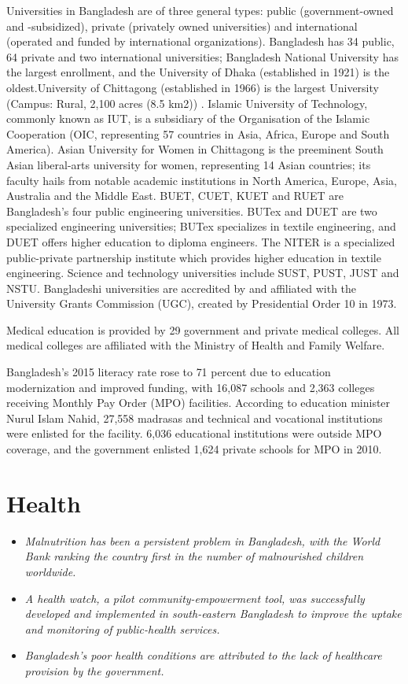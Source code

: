 Universities in Bangladesh are of three general types: public
(government-owned and -subsidized), private (privately owned
universities) and international (operated and funded by international
organizations). Bangladesh has 34 public, 64 private and two
international universities; Bangladesh National University has the
largest enrollment, and the University of Dhaka (established in 1921) is
the oldest.University of Chittagong (established in 1966) is the largest
University (Campus: Rural, 2,100 acres (8.5 km2)) . Islamic University
of Technology, commonly known as IUT, is a subsidiary of the
Organisation of the Islamic Cooperation (OIC, representing 57 countries
in Asia, Africa, Europe and South America). Asian University for Women
in Chittagong is the preeminent South Asian liberal-arts university for
women, representing 14 Asian countries; its faculty hails from notable
academic institutions in North America, Europe, Asia, Australia and the
Middle East. BUET, CUET, KUET and RUET are Bangladesh's four public
engineering universities. BUTex and DUET are two specialized engineering
universities; BUTex specializes in textile engineering, and DUET offers
higher education to diploma engineers. The NITER is a specialized
public-private partnership institute which provides higher education in
textile engineering. Science and technology universities include SUST,
PUST, JUST and NSTU. Bangladeshi universities are accredited by and
affiliated with the University Grants Commission (UGC), created by
Presidential Order 10 in 1973.

Medical education is provided by 29 government and private medical
colleges. All medical colleges are affiliated with the Ministry of
Health and Family Welfare.

Bangladesh's 2015 literacy rate rose to 71 percent due to education
modernization and improved funding, with 16,087 schools and 2,363
colleges receiving Monthly Pay Order (MPO) facilities. According to
education minister Nurul Islam Nahid, 27,558 madrasas and technical and
vocational institutions were enlisted for the facility. 6,036
educational institutions were outside MPO coverage, and the government
enlisted 1,624 private schools for MPO in 2010.

\section{Health}\label{health}

\begin{itemize}
\item
  \emph{Malnutrition has been a persistent problem in Bangladesh, with
  the World Bank ranking the country first in the number of malnourished
  children worldwide.}
\item
  \emph{A health watch, a pilot community-empowerment tool, was
  successfully developed and implemented in south-eastern Bangladesh to
  improve the uptake and monitoring of public-health services.}
\item
  \emph{Bangladesh's poor health conditions are attributed to the lack
  of healthcare provision by the government.}
\end{itemize}


